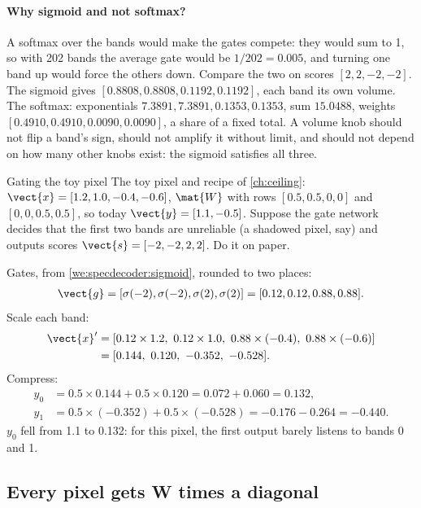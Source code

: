 \paragraph{Why sigmoid and not softmax?} A softmax over the bands would make the gates compete: they would sum to 1, so with 202 bands the average gate would be $1/202 = 0.005$, and turning one band up would force the others down. Compare the two on scores $[2, 2, -2, -2]$. The sigmoid gives $[0.8808, 0.8808, 0.1192, 0.1192]$, each band its own volume. The softmax: exponentials $7.3891, 7.3891, 0.1353, 0.1353$, sum $15.0488$, weights $[0.4910, 0.4910, 0.0090, 0.0090]$, a share of a fixed total. A volume knob should not flip a band's sign, should not amplify it without limit, and should not depend on how many other knobs exist: the sigmoid satisfies all three.

\begin{worked}[label={we:specdecoder:gatework}]{Gating the toy pixel}
The toy pixel and recipe of \cref{ch:ceiling}: $\vect{x} = [1.2, 1.0, -0.4, -0.6]$, $\mat{W}$ with rows $[0.5, 0.5, 0, 0]$ and $[0, 0, 0.5, 0.5]$, so today $\vect{y} = [1.1, -0.5]$. Suppose the gate network decides that the first two bands are unreliable (a shadowed pixel, say) and outputs scores $\vect{s} = [-2, -2, 2, 2]$. Do it on paper.

Gates, from \cref{we:specdecoder:sigmoid}, rounded to two places:
\begin{align*}
  \vect{g} = [\sigma(-2), \sigma(-2), \sigma(2), \sigma(2)] = [0.12, 0.12, 0.88, 0.88].
\end{align*}
Scale each band:
\begin{align*}
  \vect{x}' &= [0.12\times1.2,\ 0.12\times1.0,\ 0.88\times(-0.4),\ 0.88\times(-0.6)]\\
  &= [0.144,\ 0.120,\ -0.352,\ -0.528].
\end{align*}
Compress:
\begin{align*}
  y_0 &= 0.5\times0.144 + 0.5\times0.120 = 0.072 + 0.060 = 0.132,\\
  y_1 &= 0.5\times(-0.352) + 0.5\times(-0.528) = -0.176 - 0.264 = -0.440 .
\end{align*}
$y_0$ fell from 1.1 to 0.132: for this pixel, the first output barely listens to bands 0 and 1.
\end{worked}

\subsection{Every pixel gets W times a diagonal}

